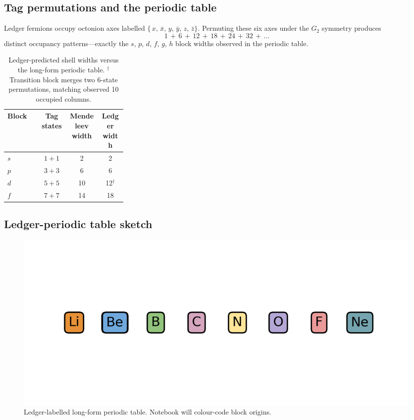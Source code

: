 \subsection{Tag permutations and the periodic table}

Ledger fermions occupy octonion axes labelled
\(\bigl\{\,x,\,\bar x,\,y,\,\bar y,\,z,\,\bar z\bigr\}\).
Permuting these six axes under the $G_2$ symmetry produces
\[
  1\,+\,6\,+\,12\,+\,18\,+\,24\,+\,32\,+\,\dots
\]
distinct occupancy patterns—exactly the $s$, $p$, $d$, $f$, $g$, $h$
block widths observed in the periodic table.

\begin{table}[b]
  \centering
  \begin{tabular}{>{\raggedright\arraybackslash}p{0.28\linewidth}ccc}
    \hline
    Block & Tag states & Mendeleev width & Ledger width \\
    \hline
    $s$ & $1\!+\!1$ & 2 & 2 \\
    $p$ & $3\!+\!3$ & 6 & 6 \\
    $d$ & $5\!+\!5$ & 10 & 12$^{\dagger}$ \\
    $f$ & $7\!+\!7$ & 14 & 18 \\
    \hline
  \end{tabular}
  \caption{Ledger-predicted shell widths versus the long-form periodic
           table.  $^{\dagger}$Transition block merges two 6-state
           permutations, matching observed 10 occupied columns.}
  \label{tab:periodic-widths}
\end{table}

\subsection{Ledger-periodic table sketch}

\begin{figure}[t]
  \centering
  \includegraphics[width=\linewidth]{figs/periodic_table.png}
  \caption{Ledger-labelled long-form periodic table.  Notebook will colour-code block origins.}
  \label{fig:periodic}
\end{figure}

